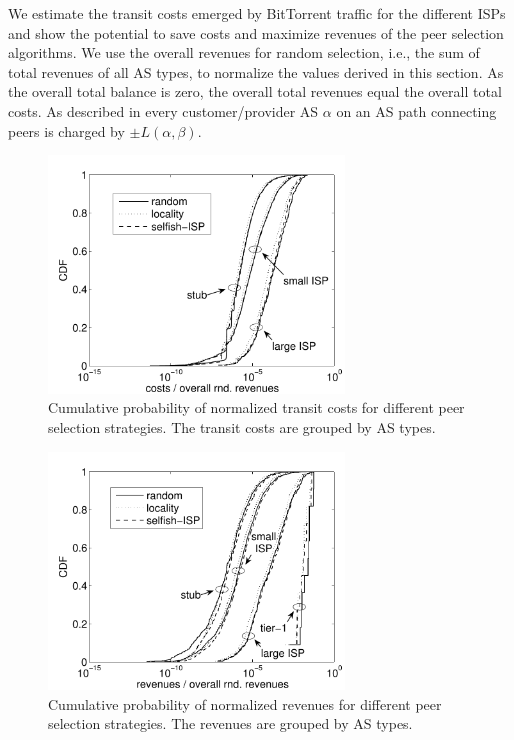We estimate the transit costs emerged by BitTorrent traffic for the different ISPs and show the potential to save costs and maximize revenues of the peer selection algorithms. We use the overall revenues for random selection, i.e., the sum of total revenues of all AS types, to normalize the values derived in this section. As the overall total balance is zero, the overall total revenues equal the overall total costs.
As described in  every customer/provider AS $\alpha$ on an AS path connecting peers is charged by $\pm L(\alpha,\beta)$.

\begin{figure}[bt]
	\centering
	\includegraphics[width=0.7\textwidth]{aslevel/p2p/results/figs/costs_CDF}
 	\caption{Cumulative probability of normalized transit costs for different peer selection strategies. The transit costs are grouped by AS types.}
 	\label{fig:costs_CDF}
\end{figure}

\begin{figure}
	\centering
	\includegraphics[width=0.7\textwidth]{aslevel/p2p/results/figs/revenues_CDF}
 	\caption{Cumulative probability of normalized revenues for different peer selection strategies. The revenues are grouped by AS types.}
 	\label{fig:revenues_CDF}
\end{figure}


